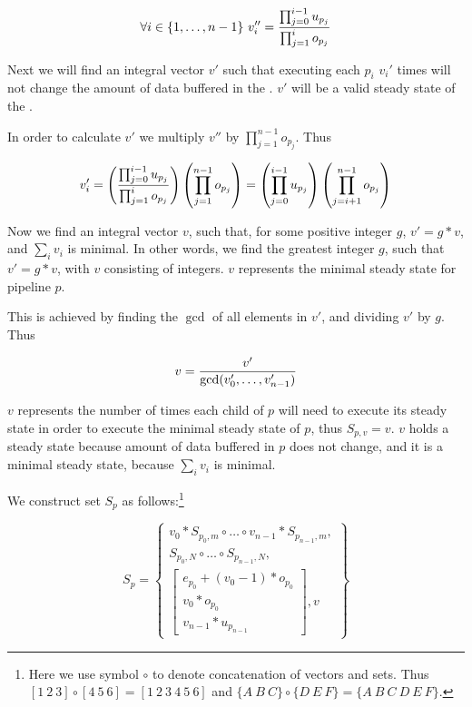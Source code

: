\begin{displaymath}
\forall i \in \{1,\dots,n-1\}\ v_i'' = {\prod_{j = 0}^{i-1}
u_{p_j} \over \prod_{j=1}^i o_{p_j}}
\end{displaymath}

Next we will find an integral vector $v'$ such that executing each
$p_i$ $v_i'$ times will not change the amount of data buffered in
the {\pipeline}.  $v'$ will be a valid steady state of the
{\pipeline}.

In order to calculate $v'$ we multiply $v''$ by $\prod_{j=1}^{n-1}
o_{p_j}$.  Thus

\begin{displaymath}
v'_i = \left({\prod_{j = 0}^{i-1} u_{p_j} \over \prod_{j=1}^i
o_{p_j}} \right) \left(\prod_{j=1}^{n-1} o_{p_j} \right) = \left(
\prod_{j=0}^{i-1} u_{p_j} \right) \left( \prod_{j=i+1}^{n-1}
o_{p_j} \right)
\end{displaymath}

Now we find an integral vector $v$, such that, for some positive
integer $g$, $v' = g * v$, and $\sum_i v_i$ is minimal.  In other
words, we find the greatest integer $g$, such that $v' = g * v$,
with $v$ consisting of integers.  $v$ represents the minimal
steady state for pipeline $p$.

This is achieved by finding the $\gcd$ of all elements in $v'$,
and dividing $v'$ by $g$.  Thus

\begin{displaymath}
v = {v' \over \gcd(v'_0,\dots,v'_{n-1})}
\end{displaymath}

$v$ represents the number of times each child of $p$ will need to
execute its steady state in order to execute the minimal steady
state of $p$, thus $S_{p,v} = v$.  $v$ holds a steady state
because amount of data buffered in $p$ does not change, and it is
a minimal steady state, because $\sum_i v_i$ is minimal.

We construct set $S_p$ as follows:\footnote{Here we use symbol
$\circ$ to denote concatenation of vectors and sets.  Thus $[1\ 2\
3] \circ [4\ 5\ 6] = [1\ 2\ 3\ 4\ 5\ 6]$ and $\{A\ B\ C\} \circ
\{D\ E\ F\} = \{A\ B\ C\ D\ E\ F\}$.}

\begin{displaymath}
S_p = \left\{ \begin{array}{c} v_0 * S_{p_0,m} \circ \dots \circ
v_{n-1}
* S_{p_{n-1}, m}, \\ S_{p_0, N} \circ \dots \circ S_{p_{n-1}, N}, \\
\left[
\begin{array}{c}
e_{p_0} + (v_0 - 1) * o_{p_0} \\
v_0 * o_{p_0} \\
v_{n-1} * u_{p_{n-1}}
\end{array}\right], v \end{array} \right\}
\end{displaymath}


